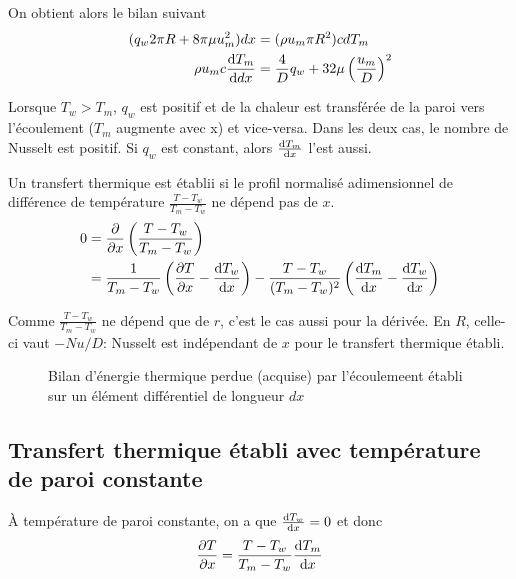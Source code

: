 \documentclass[a4paper,11pt]{report}
\newcommand{\recip}[1]{\frac{1}{#1}}
\begin{document}
    On obtient alors le bilan suivant
    \begin{equation}
      \begin{aligned}
        (q_w 2\pi R + 8 \pi \mu u_m^2) dx &= (\rho u_m \pi R^2)cdT_m\\
        \rho u_m c \dv{T_m}{dx} &= \frac{4}{D} q_w + 32 \mu \left(\frac{u_m}{D}\right)^2
      \end{aligned}
    \end{equation}

    Lorsque $T_w > T_m$, $q_w$ est positif et de la chaleur est transférée de la paroi vers l'écoulement ($T_m$ augmente avec x) et vice-versa. Dans les deux cas, le nombre de Nusselt est positif. Si $q_w$ est constant, alors $\dv{T_m}{x}$ l'est aussi.

    Un transfert thermique est établii si le profil normalisé adimensionnel de différence de température $\frac{T - T_w}{T_m - T_w}$ ne dépend pas de $x$.
    \begin{equation}
      \begin{aligned}
        0 &= \pdv{x} \left(\frac{T-T_w}{T_m - T_w}\right)\\
        &= \recip{T_m - T_w} \left(\pdv{T}{x} - \dv{T_w}{x}\right) - \frac{T-T_w}{(T_m - T_w)^2} \left(\dv{T_m}{x} - \dv{T_w}{x}\right)
      \end{aligned}
    \end{equation}

    Comme $\frac{T - T_w}{T_m - T_w}$ ne dépend que de $r$, c'est le cas aussi pour la dérivée. En $R$, celle-ci vaut $-Nu/D$: Nusselt est indépendant de $x$ pour le transfert thermique établi.

    \begin{figure}[!h]
      \centering
      
      \caption{Bilan d'énergie thermique perdue (acquise) par l'écoulemeent établi sur un élément différentiel de longueur $dx$}
      \label{bilanEnerg}
    \end{figure}

    \subsection{Transfert thermique établi avec température de paroi constante}
      À température de paroi constante, on a que $\dv{T_w}{x} = 0$ et donc
      \begin{equation}
        \pdv{T}{x} = \frac{T-T_w}{T_m - T_w} \dv{T_m}{x}
      \end{equation}
\end{document}
